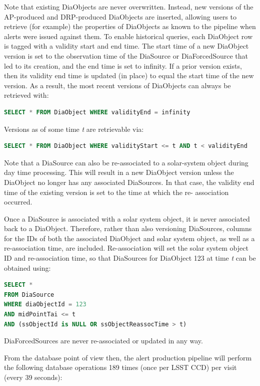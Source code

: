 \documentclass[DM,lsstdraft,toc]{lsstdoc}
\begin{document}
Note that existing DiaObjects are never overwritten. Instead, new versions of
the AP-produced and DRP-produced DiaObjects are inserted, allowing users to
retrieve (for example) the properties of DiaObjects as known to the pipeline
when alerts were issued against them. To enable historical queries, each
DiaObject row is tagged with a validity start and end time. The start time of
a new DiaObject version is set to the observation time of the DiaSource or
DiaForcedSource that led to its creation, and the end time is set to infinity.
If a prior version exists, then its validity end time is updated (in place) to
equal the start time of the new version. As a result, the most recent versions
of DiaObjects can always be retrieved with:

\begin{lstlisting}[language=SQL]
SELECT * FROM DiaObject WHERE validityEnd = infinity
\end{lstlisting}

Versions as of some time \emph{t} are retrievable via:

\begin{lstlisting}[language=SQL]
SELECT * FROM DiaObject WHERE validityStart <= t AND t < validityEnd
\end{lstlisting}

Note that a DiaSource can also be re-associated to a solar-system object
during day time processing. This will result in a new DiaObject version unless
the DiaObject no longer has any associated DiaSources. In that case, the
validity end time of the existing version is set to the time at which the re-
association occurred.

Once a DiaSource is associated with a solar system object, it is never
associated back to a DiaObject. Therefore, rather than also versioning
DiaSources, columns for the IDs of both the associated DiaObject and solar
system object, as well as a re-association time, are included. Re-association
will set the solar system object ID and re-association time, so that
DiaSources for DiaObject 123 at time \emph{t} can be obtained using:

\begin{lstlisting}[language=SQL]
SELECT *
FROM DiaSource
WHERE diaObjectId = 123
AND midPointTai <= t
AND (ssObjectId is NULL OR ssObjectReassocTime > t)
\end{lstlisting}

DiaForcedSources are never re-associated or updated in any way.

From the database point of view then, the alert production pipeline will
perform the following database operations 189 times (once per LSST CCD) per
visit (every 39 seconds):
\end{document}
